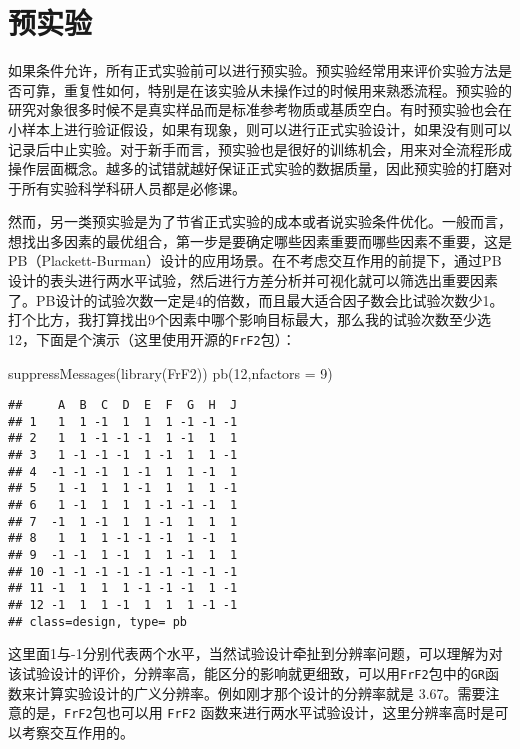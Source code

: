 \documentclass[]{tufte-book}
\newenvironment{Shaded}{}{}
\newcommand{\AttributeTok}[1]{\textcolor[rgb]{0.49,0.56,0.16}{#1}}
\newcommand{\DecValTok}[1]{\textcolor[rgb]{0.25,0.63,0.44}{#1}}
\newcommand{\FunctionTok}[1]{\textcolor[rgb]{0.02,0.16,0.49}{#1}}
\newcommand{\NormalTok}[1]{#1}
\begin{document}
\hypertarget{ux9884ux5b9eux9a8c}{%
\section{预实验}\label{ux9884ux5b9eux9a8c}}

如果条件允许，所有正式实验前可以进行预实验。预实验经常用来评价实验方法是否可靠，重复性如何，特别是在该实验从未操作过的时候用来熟悉流程。预实验的研究对象很多时候不是真实样品而是标准参考物质或基质空白。有时预实验也会在小样本上进行验证假设，如果有现象，则可以进行正式实验设计，如果没有则可以记录后中止实验。对于新手而言，预实验也是很好的训练机会，用来对全流程形成操作层面概念。越多的试错就越好保证正式实验的数据质量，因此预实验的打磨对于所有实验科学科研人员都是必修课。

然而，另一类预实验是为了节省正式实验的成本或者说实验条件优化。一般而言，想找出多因素的最优组合，第一步是要确定哪些因素重要而哪些因素不重要，这是PB（Plackett-Burman）设计的应用场景。在不考虑交互作用的前提下，通过PB设计的表头进行两水平试验，然后进行方差分析并可视化就可以筛选出重要因素了。PB设计的试验次数一定是4的倍数，而且最大适合因子数会比试验次数少1。打个比方，我打算找出9个因素中哪个影响目标最大，那么我的试验次数至少选12，下面是个演示（这里使用开源的\texttt{FrF2}包）：

\begin{Shaded}
\begin{Highlighting}[]
\FunctionTok{suppressMessages}\NormalTok{(}\FunctionTok{library}\NormalTok{(FrF2))}
\FunctionTok{pb}\NormalTok{(}\DecValTok{12}\NormalTok{,}\AttributeTok{nfactors =} \DecValTok{9}\NormalTok{)}
\end{Highlighting}
\end{Shaded}

\begin{verbatim}
##     A  B  C  D  E  F  G  H  J
## 1   1  1 -1  1  1  1 -1 -1 -1
## 2   1  1 -1 -1 -1  1 -1  1  1
## 3   1 -1 -1 -1  1 -1  1  1 -1
## 4  -1 -1 -1  1 -1  1  1 -1  1
## 5   1 -1  1  1 -1  1  1  1 -1
## 6   1 -1  1  1  1 -1 -1 -1  1
## 7  -1  1 -1  1  1 -1  1  1  1
## 8   1  1  1 -1 -1 -1  1 -1  1
## 9  -1 -1  1 -1  1  1 -1  1  1
## 10 -1 -1 -1 -1 -1 -1 -1 -1 -1
## 11 -1  1  1  1 -1 -1 -1  1 -1
## 12 -1  1  1 -1  1  1  1 -1 -1
## class=design, type= pb
\end{verbatim}

这里面1与-1分别代表两个水平，当然试验设计牵扯到分辨率问题，可以理解为对该试验设计的评价，分辨率高，能区分的影响就更细致，可以用\texttt{FrF2}包中的\texttt{GR}函数来计算实验设计的广义分辨率。例如刚才那个设计的分辨率就是 3.67。需要注意的是，\texttt{FrF2}包也可以用 \texttt{FrF2} 函数来进行两水平试验设计，这里分辨率高时是可以考察交互作用的。
\end{document}
